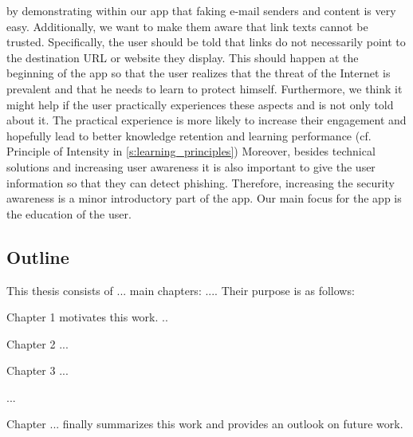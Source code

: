  
 by demonstrating within our app that faking e-mail senders and content is very easy.
 Additionally, we want to make them aware that link texts cannot be trusted.
Specifically, the user should be told that links do not necessarily point to the destination URL or website they display.
 This should happen at the beginning of the app so that the user realizes that the threat of the Internet is prevalent and that he needs to learn to protect himself.
 Furthermore, we think it might help if the user practically experiences these aspects and is not only told about it.
The practical experience is more likely to increase their engagement and hopefully lead to better knowledge retention and learning performance (cf. Principle of Intensity in \autoref{s:learning_principles}) 
 Moreover, besides technical solutions and increasing user awareness it is also important to give the user information so that they can detect phishing.
 Therefore, increasing the security awareness is a minor introductory part of the app.
 Our main focus for the app is the education of the user.

\subsection{Outline}


This thesis consists of ... main chapters: .... Their purpose is as follows:

Chapter 1 motivates this work.
..

Chapter 2 ...

Chapter 3 ...

...

Chapter ... finally summarizes this work and provides an outlook on future work.






